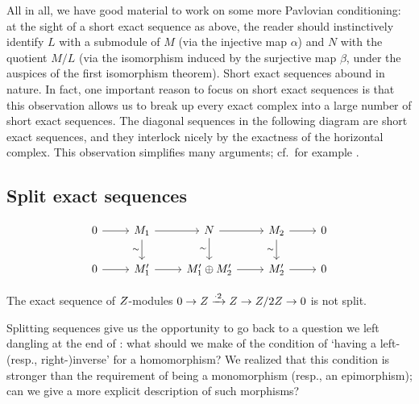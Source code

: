 All in all, we have good material to work on some more Pavlovian
conditioning: at the sight of a short exact sequence as above, the
reader should instinctively identify $L$ with a submodule of $M$ (via
the injective map $\alpha$) and $N$ with the quotient $M/L$ (via the
isomorphism induced by the surjective map $\beta$, under the auspices
of the first isomorphism theorem).  Short exact sequences abound in
nature. 
In fact, one important reason to focus on short exact sequences is
that this observation allows us to break up every exact complex into a
large number of short exact sequences. The diagonal sequences in the
following diagram are short exact sequences, and they interlock nicely
by the exactness of the horizontal complex. This observation
simplifies many arguments; cf.\ for example
.

\subsection{Split exact sequences}
\label{subsec:rings:split-exact-sequences}
\[\begin{tikzcd}
    0 \arrow[r] & M_1 \arrow[r] \arrow[d, "\sim"'] & N \arrow[r] \arrow[d, "\sim"'] & M_2 \arrow[r] \arrow[d, "\sim"'] & 0 \\
    0 \arrow[r] & M_1' \arrow[r] & M_1' \oplus M_2' \arrow[r] & M_2'
    \arrow[r] & 0
  \end{tikzcd}\]

\begin{exam}{}{}
  The exact sequence of $Z$-modules
  $0 \to Z \xrightarrow{\cdot 2} Z \to Z/2Z \to 0$ is not split.
\end{exam}
Splitting sequences give us the opportunity to go back to a question
we left dangling at the end of
: what should we make of
the condition of `having a left- (resp., right-)inverse' for a
homomorphism? We realized that this condition is stronger than the
requirement of being a monomorphism (resp., an epimorphism); can we
give a more explicit description of such morphisms?

